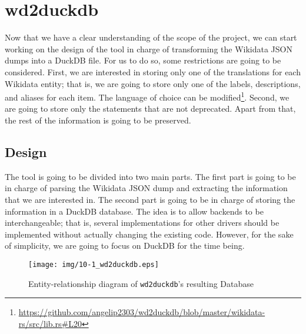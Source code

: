 \section{wd2duckdb}

Now that we have a clear understanding of the scope of the project, we can start working on the design of the tool in charge of transforming the Wikidata JSON dumps into a DuckDB file. For us to do so, some restrictions are going to be considered. First, we are interested in storing only one of the translations for each Wikidata entity; that is, we are going to store only one of the labels, descriptions, and aliases for each item. The language of choice can be modified\footnote{\url{https://github.com/angelip2303/wd2duckdb/blob/master/wikidata-rs/src/lib.rs\#L20}}. Second, we are going to store only the statements that are not deprecated. Apart from that, the rest of the information is going to be preserved.

\label{section:wd2duckdb_design}
\subsection{Design}

The tool is going to be divided into two main parts. The first part is going to be in charge of parsing the Wikidata JSON dump and extracting the information that we are interested in. The second part is going to be in charge of storing the information in a DuckDB database. The idea is to allow backends to be interchangeable; that is, several implementations for other drivers should be implemented without actually changing the existing code. However, for the sake of simplicity, we are going to focus on DuckDB for the time being.

\begin{figure}[ht]
    \centering
    \texttt{[image: img/10-1\_wd2duckdb.eps]}
    \caption{Entity-relationship diagram of \texttt{wd2duckdb}'s resulting Database}
\end{figure}%